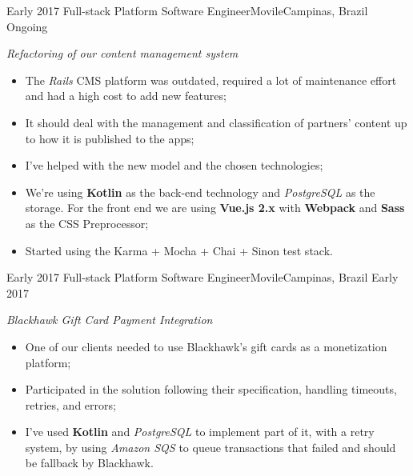 %
%
%


\begin{experiences}
  \experience
  {Early 2017} {Full-stack Platform Software Engineer}{Movile}{Campinas, Brazil}
  {Ongoing}
        {
        \emph{Refactoring of our content management system}\\
          \begin{itemize}
            \item The \emph{Rails} CMS platform was outdated, required a lot of maintenance effort and had a high cost to add new features;
            \item It should deal with the management and classification of partners' content up to how it is published to the apps;
            \item I've helped with the new model and the chosen technologies;
            \item We're using \textbf{Kotlin} as the back-end technology and \emph{PostgreSQL} as the storage. For the front end we are using \textbf{Vue.js 2.x} with \textbf{Webpack} and \textbf{Sass} as the CSS Preprocessor;
            \item Started using the Karma + Mocha + Chai + Sinon test stack.\\
          \end{itemize}
        }{}
  \experience
  {Early 2017} {Full-stack Platform Software Engineer}{Movile}{Campinas, Brazil}
  {Early 2017}
        {
        \emph{Blackhawk Gift Card Payment Integration}\\
          \begin{itemize}
            \item One of our clients needed to use Blackhawk's gift cards as a monetization platform;
            \item Participated in the solution following their specification, handling timeouts, retries, and errors;
            \item I've used \textbf{Kotlin} and \emph{PostgreSQL} to implement part of it, with a retry system, by using \emph{Amazon SQS} to queue
            transactions that failed and should be fallback by Blackhawk.\\

\end{itemize}}
\end{experiences}
